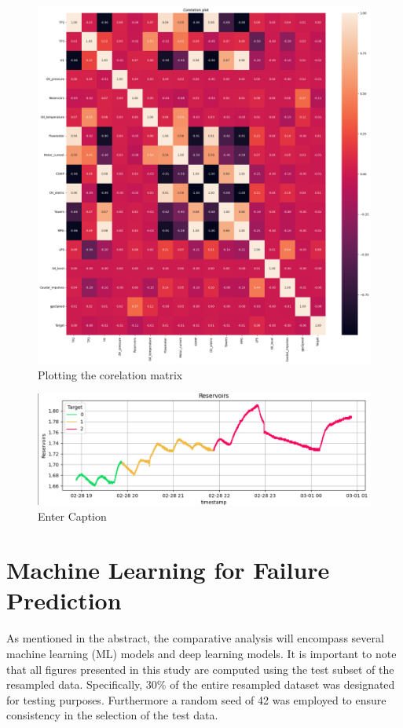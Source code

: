 \documentclass{article}
\begin{document}
\begin{figure}
    \centering
    \includegraphics[width=1\linewidth]{cm.png}
    \caption{Plotting the corelation matrix}
    \label{fig:Corealtions}
\end{figure}

\begin{figure}
    \centering
    \includegraphics[width=1\linewidth]{EDA_Res.png}
    \caption{Enter Caption}
    \label{fig:enter-label}
\end{figure}

\section{Machine Learning for Failure Prediction}

As mentioned in the abstract, the comparative analysis will encompass several machine learning (ML) models and deep learning models. It is important to note that all figures presented in this study are computed using the test subset of the resampled data. Specifically, 30\% of the entire resampled dataset was designated for testing purposes. Furthermore a random seed of 42 was employed to ensure consistency in the selection of the test data. \\
\end{document}
